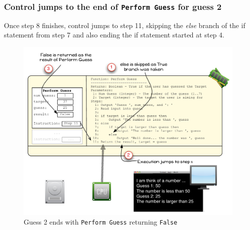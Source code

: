 
\clearpage

\subsubsection{Control jumps to the end of \texttt{Perform Guess} for guess 2} %
\label{ssub:control_jumps_to_step_11_for_guess_2}

Once step 8 finishes, control jumps to step 11, skipping the \emph{else} branch of the if statement from step 7 and also ending the if statement started at step 4.

\begin{figure}[htbp]
   \centering
   \includegraphics[width=\textwidth]{./topics/control-flow/images/PerformGuess8} 
   \caption{Guess 2 ends with \texttt{Perform Guess} returning \texttt{False}}
   \label{fig:perform-guess-8}
\end{figure}

